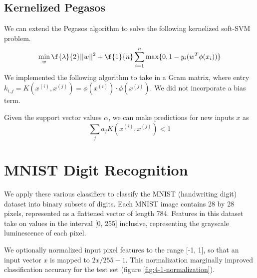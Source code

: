 \documentclass{article}
\begin{document}
\begin{multicols}{2}
\subsection{Kernelized Pegasos}

We can extend the Pegasos algorithm to solve the following kernelized soft-SVM problem.
\begin{equation}
   \min_w{\f{\lambda}{2}||w||^2} + \f{1}{n}\sum_{i=1}^n{\max\{0,1-y_i(w^T\phi(x_i))\}}
\end{equation}
We implemented the following algorithm to take in a Gram matrix, where entry $k_{i,j} = K(x^{(i)},x^{(j)}) = \phi(x^{(i)})\cdot\phi(x^{(j)})$. We did not incorporate a bias term.


Given the support vector values $\alpha$, we can make predictions for new inputs $x$ as 
\begin{equation}
    \sum_j{a_j K(x^{(i)},x^{(j)}) < 1 }
\end{equation}


\section{MNIST Digit Recognition}

We apply these various classifiers to classify the MNIST (handwriting digit) dataset into binary subsets of digits. Each MNIST image contains 28 by 28 pixels, represented as a flattened vector of length 784. Features in this dataset take on values in the interval [0, 255] inclusive, representing the grayscale luminescence of each pixel.

We optionally normalized input pixel features to the range [-1, 1], so that an input vector $x$ is mapped to $2x/255-1$. This normalization marginally improved classification accuracy for the test set (figure \ref{fig:4-1-normalization}).


\end{multicols}
\end{document}
